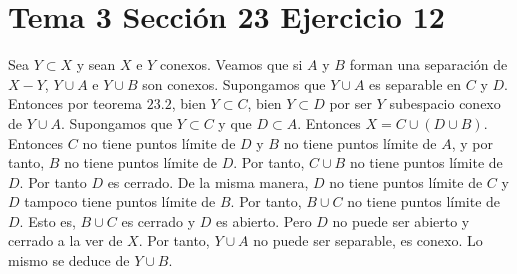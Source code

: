 \documentclass{article}
\begin{document}
\section{Tema 3 Sección 23 Ejercicio 12}
Sea $Y\subset X$ y sean $X$ e $Y$ conexos. Veamos que si $A$ y $B$ forman una separación de $X-Y$, $Y\cup A$ e $Y\cup B$ son conexos. Supongamos que $Y\cup A$ es separable en $C$ y $D$. Entonces por teorema $23.2$, bien $Y\subset C$, bien $Y\subset D$ por ser $Y$ subespacio conexo de $Y\cup A$. Supongamos que $Y\subset C$ y que $D\subset A$.  Entonces $X=C\cup (D\cup B)$. Entonces $C$ no tiene puntos límite de $D$ y $B$ no tiene puntos límite de $A$, y por tanto, $B$ no tiene puntos límite de $D$. Por tanto, $C\cup B$ no tiene puntos límite de $D$. Por tanto $D$ es cerrado. De la misma manera, $D$ no tiene puntos límite de $C$ y $D$ tampoco tiene  puntos límite de $B$. Por tanto, $B\cup C$ no tiene puntos límite de $D$. Esto es, $B\cup C$ es cerrado y $D$ es abierto. Pero $D$ no puede ser abierto y cerrado a la ver de $X$. Por tanto, $Y\cup A$ no puede ser separable, es conexo. Lo mismo se deduce de $Y\cup B$.
\end{document}
